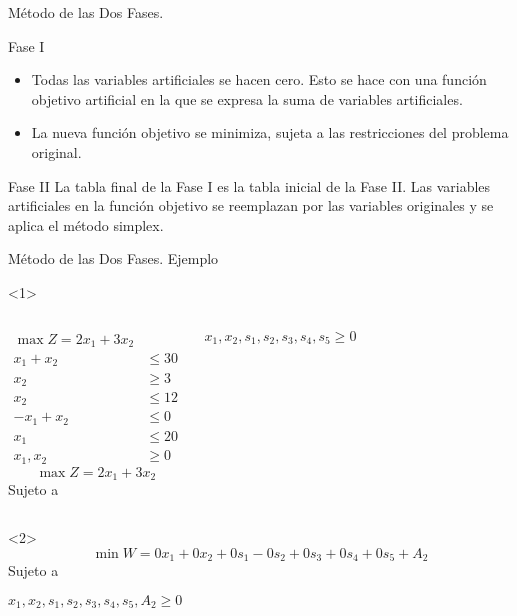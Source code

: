 \begin{frame}{Método de las Dos Fases.}{}

  \begin{block}{Fase I} \justifying
    \begin{itemize} \parskip3mm \justifying
    \item Todas las variables artificiales se hacen cero. Esto se hace con una función objetivo artificial en la que se expresa la suma de variables artificiales.
    \item La nueva \alert{función objetivo se minimiza}, sujeta a las restricciones del problema original.
    \end{itemize}
  \end{block}
  \begin{block}{Fase II}\justifying
    La tabla final de la Fase I es la tabla inicial de la Fase II. Las variables artificiales en la función objetivo se reemplazan  por las variables originales y se aplica el método simplex.
  \end{block}
\end{frame}    

\begin{frame}{Método de las Dos Fases. Ejemplo}{}
  \begin{onlyenv}<1>
    \begin{columns}
      \begin{align*}
        \max Z = 2x_1 + 3x_2 & \\[5mm]
        x_1 + x_2 & \leq 30\\
        x_2 & \geq 3\\
        x_2 & \leq 12\\
        -x_1 + x_2 & \leq 0\\
        x_1  & \leq 20 \\[5mm]
        x_1, x_2 & \geq 0
      \end{align*}  
      \[ \max Z = 2x_1 + 3x_2\]
      Sujeto a 

      $x_1, x_2, s_1, s_2, s_3, s_4, s_5  \geq 0$ 
    \end{columns}
  \end{onlyenv}

  \begin{onlyenv}<2>
    \[ \min W = 0x_1 + 0x_2 +0s_1 - 0s_2 + 0s_3 + 0s_4 + 0s_5 + A_2 \]
    Sujeto a 

    $x_1, x_2, s_1, s_2, s_3, s_4, s_5, A_2  \geq 0$
  \end{onlyenv}
\end{frame}

